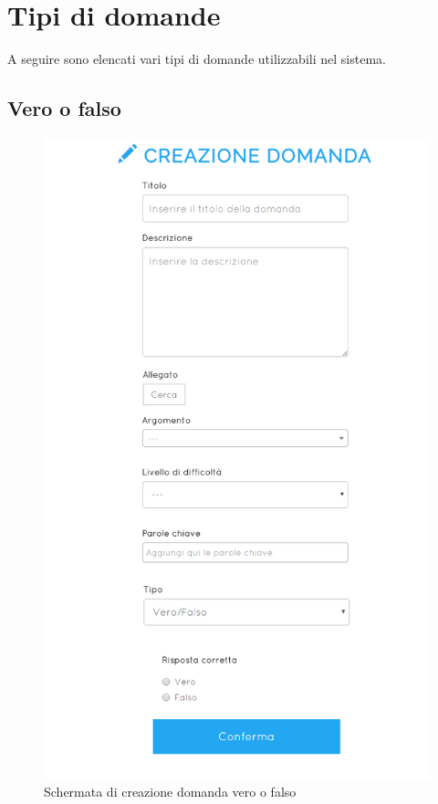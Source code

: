 \documentclass[a4paper, titlepage]{article}
\begin{document}
	 \newpage
	 \appendix
	 
	 \section{Tipi di domande}
	 \label{domande}
	 A seguire sono elencati vari tipi di domande utilizzabili nel sistema.
	 
	 \subsection{Vero o falso}
	 \begin{figure}[!h]
 	 	\centering
 	 	\includegraphics[scale=0.33]{Img/screen_CreazioneDomandaVF.png}
 	 	\caption{Schermata di creazione domanda vero o falso}
	 \end{figure}
\end{document}

